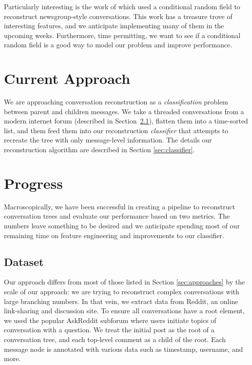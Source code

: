 \documentclass[10pt]{article}
\begin{document}
Particularly interesting is the work of \cite{Wang2011a} which used a conditional random
field to reconstruct newsgroup-style conversations. This work has a treasure trove of
interesting features, and we anticipate implementing many of them in the upcoming weeks.
Furthermore, time permitting, we want to see if a conditional random field is a good way
to model our problem and improve performance.


\section{Current Approach}
\label{sec:approach}
We are approaching conversation reconstruction as a \textit{classification} problem
between parent and children messages. We take a threaded conversations from a modern internet forum 
(described in Section~\ref{section:dataset}), flatten them into a time-sorted list, and them feed
them into our reconstruction \textit{classifier} that attempts to recreate the tree
with only message-level information. The details our reconstruction algorithm are 
described in Section \ref{sec:classifier}.

\section{Progress}
Macroscopically, we have
been successful in creating a pipeline to reconstruct conversation trees and
evaluate our performance based on two metrics. The numbers leave something to be desired and
we anticipate spending most of our remaining time on feature engineering and
improvements to our classifier.

\subsection{Dataset}
\label{section:dataset}
Our approach differs from most of those listed in Section \ref{sec:approaches}
by the scale of our approach: we are trying to reconstruct complex conversations
with large branching numbers.  In that vein, we extract data from Reddit, an
online link-sharing and discussion site. To ensure all conversations have a root
element, we used the popular AskReddit subforum where 
users initiate topics of conversation with a question. We treat the
initial post as the root of a conversation tree, and each top-level comment as a
child of the root. Each message node is annotated with various data such as
timestamp, username, and more.
\end{document}
